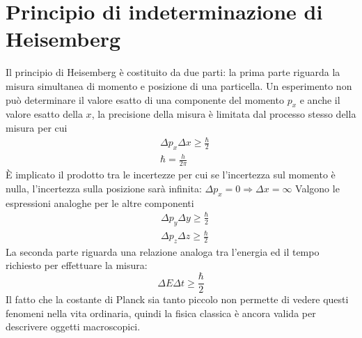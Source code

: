 

\section{Principio di indeterminazione di Heisemberg}

Il principio di Heisemberg è costituito da due parti:
la prima parte riguarda la misura simultanea di momento e posizione di una particella.
Un esperimento non può determinare il valore esatto di una componente del momento $p_x$ e anche il valore esatto della $x$, la precisione della misura è limitata dal processo stesso della misura per cui
\begin{equation}
\begin{split}
& \Delta p_x \Delta x \ge \frac{ \hbar}{2 } \\
& \hbar = \frac{ h}{2\pi }
\end{split}
\end{equation}
È implicato il prodotto tra le incertezze per cui se l'incertezza sul momento è nulla, l'incertezza sulla posizione sarà infinita: $\Delta p_x = 0 \Rightarrow \Delta x = \infty$
Valgono le espressioni analoghe per le altre componenti
\begin{equation}
\begin{split}
& \Delta p_y \Delta y \ge \frac{ \hbar}{2 } \\
& \Delta p_z \Delta z \ge \frac{ \hbar}{2 }
\end{split}
\end{equation}
La seconda parte riguarda una relazione analoga tra l'energia ed il tempo richiesto per effettuare la misura:
\begin{equation}
\Delta E \Delta t \ge \frac{\hbar}{2}
\end{equation}
Il fatto che la costante di Planck sia tanto piccolo non permette di vedere questi fenomeni nella vita ordinaria, quindi la fisica classica è ancora valida per descrivere oggetti macroscopici.


